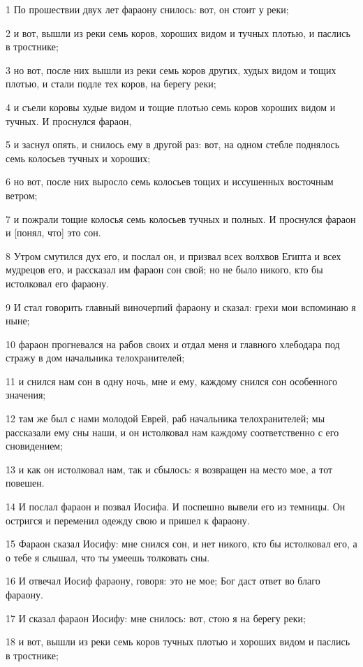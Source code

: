 \par 1 По прошествии двух лет фараону снилось: вот, он стоит у реки;
\par 2 и вот, вышли из реки семь коров, хороших видом и тучных плотью, и паслись в тростнике;
\par 3 но вот, после них вышли из реки семь коров других, худых видом и тощих плотью, и стали подле тех коров, на берегу реки;
\par 4 и съели коровы худые видом и тощие плотью семь коров хороших видом и тучных. И проснулся фараон,
\par 5 и заснул опять, и снилось ему в другой раз: вот, на одном стебле поднялось семь колосьев тучных и хороших;
\par 6 но вот, после них выросло семь колосьев тощих и иссушенных восточным ветром;
\par 7 и пожрали тощие колосья семь колосьев тучных и полных. И проснулся фараон и [понял, что] это сон.
\par 8 Утром смутился дух его, и послал он, и призвал всех волхвов Египта и всех мудрецов его, и рассказал им фараон сон свой; но не было никого, кто бы истолковал его фараону.
\par 9 И стал говорить главный виночерпий фараону и сказал: грехи мои вспоминаю я ныне;
\par 10 фараон прогневался на рабов своих и отдал меня и главного хлебодара под стражу в дом начальника телохранителей;
\par 11 и снился нам сон в одну ночь, мне и ему, каждому снился сон особенного значения;
\par 12 там же был с нами молодой Еврей, раб начальника телохранителей; мы рассказали ему сны наши, и он истолковал нам каждому соответственно с его сновидением;
\par 13 и как он истолковал нам, так и сбылось: я возвращен на место мое, а тот повешен.
\par 14 И послал фараон и позвал Иосифа. И поспешно вывели его из темницы. Он остригся и переменил одежду свою и пришел к фараону.
\par 15 Фараон сказал Иосифу: мне снился сон, и нет никого, кто бы истолковал его, а о тебе я слышал, что ты умеешь толковать сны.
\par 16 И отвечал Иосиф фараону, говоря: это не мое; Бог даст ответ во благо фараону.
\par 17 И сказал фараон Иосифу: мне снилось: вот, стою я на берегу реки;
\par 18 и вот, вышли из реки семь коров тучных плотью и хороших видом и паслись в тростнике;
